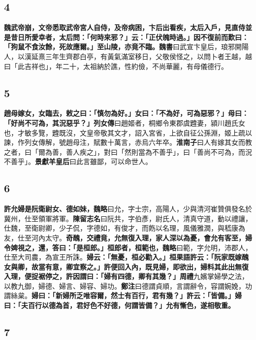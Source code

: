 \subsection*{4}

\textbf{魏武帝崩，文帝悉取武帝宮人自侍，及帝病困，卞后出看疾，太后入戶，見直侍並是昔日所愛幸者，太后問：「何時來邪？」云：「正伏魄時過。」因不復前而歎曰：「狗鼠不食汝餘，死故應爾。」至山陵，亦竟不臨。}{\footnotesize \textbf{魏書}曰武宣卞皇后，琅邪開陽人，以漢延熹三年生齊郡白亭，有黃氣滿室移日，父敬侯怪之，以問卜者王越，越曰「此吉祥也」，年二十，太祖納於譙，性約儉，不尚華麗，有母儀德行。}

\subsection*{5}

\textbf{趙母嫁女，女臨去，敕之曰：「慎勿為好。」女曰：「不為好，可為惡邪？」母曰：「好尚不可為，其況惡乎？」}{\footnotesize \textbf{列女傳}曰趙姬者，桐鄉令東郡虞韙妻，潁川趙氏女也，才敏多覽，韙既沒，文皇帝敬其文才，詔入宮省，上欲自征公孫淵，姬上疏以諫，作列女傳解，號趙母注，賦數十萬言，赤烏六年卒。\textbf{淮南子}曰人有嫁其女而教之者，曰「爾為善，善人疾之」，對曰「然則當為不善乎」，曰「善尚不可為，而況不善乎」。\textbf{景獻羊皇后}曰此言雖鄙，可以命世人。}

\subsection*{6}

\textbf{許允婦是阮衛尉女、德如妹，}{\footnotesize \textbf{魏略}曰允，字士宗，高陽人，少與清河崔贊俱發名於冀州，仕至領軍將軍。\textbf{陳留志名}曰阮共，字伯彥，尉氏人，清真守道，動以禮讓，仕魏，至衛尉卿，少子侃，字德如，有俊才，而飭以名理，風儀雅潤，與嵇康為友，仕至河內太守。}\textbf{奇醜，交禮竟，允無復入理，家人深以為憂，會允有客至，婦令婢視之，還，答曰：「是桓郎。」桓郎者，桓範也，}{\footnotesize \textbf{魏略}曰範，字允明，沛郡人，仕至大司農，為宣王所誅。}\textbf{婦云：「無憂，桓必勸入。」桓果語許云：「阮家既嫁醜女與卿，故當有意，卿宜察之。」許便回入內，既見婦，即欲出，婦料其此出無復入理，便捉裾停之，許因謂曰：「婦有四德，卿有其幾？」}{\footnotesize \textbf{周禮}九嬪掌婦學之法，以教九御，婦德、婦言、婦容、婦功。\textbf{鄭注}曰德謂貞順，言謂辭令，容謂婉娩，功謂絲枲。}\textbf{婦曰：「新婦所乏唯容爾，然士有百行，君有幾？」許云：「皆備。」婦曰：「夫百行以德為首，君好色不好德，何謂皆備？」允有慚色，遂相敬重。}

\subsection*{7}

